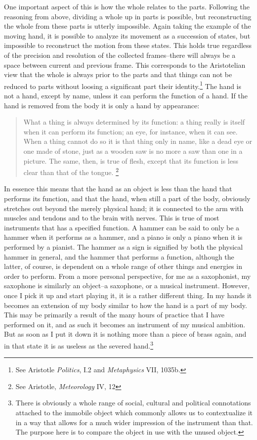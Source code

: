 \documentclass[11pt]{article}
\begin{document}
One important aspect of this is how the whole relates to the parts. Following the reasoning from above, dividing a whole up in parts is possible, but reconstructing the whole from these parts is utterly impossible. Again taking the example of the moving hand, it is possible to analyze its movement as a succession of states, but impossible to reconstruct the motion from these states. This holds true regardless of the precision and resolution of the collected frames--there will always be a space between current and previous frame. This corresponds to the Aristotelian view that the whole is always prior to the parts and that things can not be reduced to parts without loosing a significant part their identity.\footnote{See Aristotle \emph{Politics}, \RN{1}.2 and \emph{Metaphysics} \RN{7}, 1035b.} The hand is not a hand, except by name, unless it can perform the function of a hand. If the hand is removed from the body it is only a hand by appearance:

\begin{quote}
What a thing is always determined by its function: a thing really is itself when it can perform its function; an eye, for instance, when it can see. When a thing cannot do so it is that thing only in name, like a dead eye or one made of stone, just as a wooden saw is no more a saw than one in a picture. The same, then, is true of flesh, except that its function is less clear than that of the tongue. \footnote{See Aristotle, \emph{Meteorology} IV, 12}
\end{quote}

In essence this means that the hand as an object is less than the hand that performs its function, and that the hand, when still a part of the body, obviously stretches out beyond the merely physical hand; it is connected to the arm with muscles and tendons and to the brain with nerves. This is true of most instruments that has a specified function. A hammer can be said to only be a hammer when it performs as a hammer, and a piano is only a piano when it is performed by a pianist. The hammer as a sign is signified by both the physical hammer in general, and the hammer that performs a function, although the latter, of course, is dependent on a whole range of other things and energies in order to perform. From a more personal perspective, for me as a saxophonist, my saxophone is similarly an object--a saxophone, or a musical instrument. However, once I pick it up and start playing it, it is a rather different thing. In my hands it becomes an extension of my body similar to how the hand is a part of my body. This may be primarily a result of the many hours of practice that I have performed on it, and as such it becomes an instrument of my musical ambition. But as soon as I put it down it is nothing more than a piece of brass again, and in that state it is as useless as the severed hand.\footnote{There is obviously a whole range of social, cultural and political connotations attached to the immobile object which commonly allows us to contextualize it in a way that allows for a much wider impression of the instrument than that. The purpose here is to compare the object in use with the unused object.}
\end{document}
